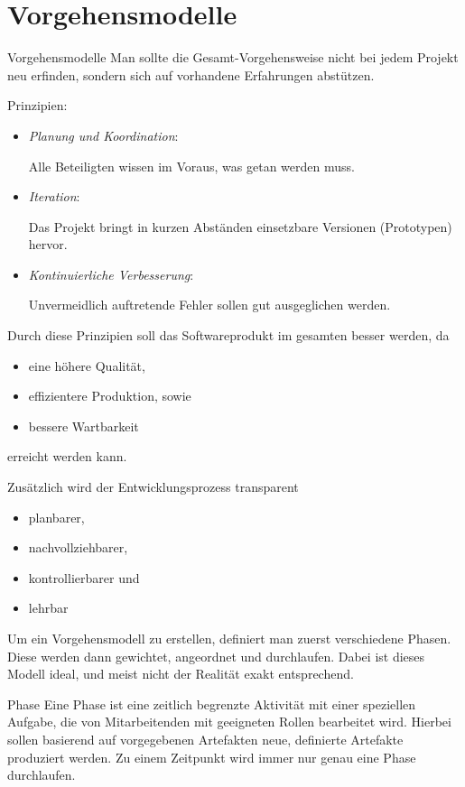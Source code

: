 \section{Vorgehensmodelle}

\begin{defi}{Vorgehensmodelle}
    Man sollte die Gesamt-Vorgehensweise nicht bei jedem Projekt neu erfinden, sondern sich auf vorhandene Erfahrungen abstützen.

    Prinzipien:
    \begin{itemize}
        \item \emph{Planung und Koordination}:

              Alle Beteiligten wissen im Voraus, was getan werden muss.
        \item \emph{Iteration}:

              Das Projekt bringt in kurzen Abständen einsetzbare Versionen (Prototypen) hervor.
        \item \emph{Kontinuierliche Verbesserung}:

              Unvermeidlich auftretende Fehler sollen gut ausgeglichen werden.
    \end{itemize}

    Durch diese Prinzipien soll das Softwareprodukt im gesamten besser werden, da
    \begin{itemize}
        \item eine höhere Qualität,
        \item effizientere Produktion, sowie
        \item bessere Wartbarkeit
    \end{itemize}
    erreicht werden kann.

    Zusätzlich wird der Entwicklungsprozess transparent
    \begin{itemize}
        \item planbarer,
        \item nachvollziehbarer,
        \item kontrollierbarer und
        \item lehrbar
    \end{itemize}

    Um ein Vorgehensmodell zu erstellen, definiert man zuerst verschiedene Phasen.
    Diese werden dann gewichtet, angeordnet und durchlaufen.
    Dabei ist dieses Modell ideal, und meist nicht der Realität exakt entsprechend.
\end{defi}

\begin{defi}{Phase}
    Eine Phase ist eine zeitlich begrenzte Aktivität mit einer speziellen Aufgabe, die von Mitarbeitenden mit geeigneten Rollen bearbeitet wird.
    Hierbei sollen basierend auf vorgegebenen Artefakten neue, definierte Artefakte produziert werden.
    Zu einem Zeitpunkt wird immer nur genau eine Phase durchlaufen.
\end{defi}

